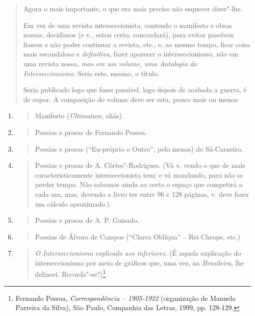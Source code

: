 \begin{quote}
Agora o mais importante, o que era mais preciso não esquecer dizer"-lhe.

Em vez de uma revista interseccionista, contendo o manifesto e obras
nossas, decidimos (e v., estou certo, concordará), para evitar possíveis
fiascos e não poder continuar a revista, etc., e, ao mesmo tempo, ficar
coisa mais escandalosa e \emph{definitiva}, fazer aparecer o
interseccionismo, não em uma revista nossa, \emph{mas em um volume, uma
Antologia do Interseccionismo}. Seria este, mesmo, o título.

Seria publicado logo que fosse possível, logo depois de acabada a
guerra, é de supor. A composição do volume deve ser esta, pouco mais ou
menos:
\end{quote}

\begin{enumerate}
\def\labelenumi{\arabic{enumi}.}
\item
  \begin{quote}
  Manifesto (\emph{Ultimatum}, aliás).
  \end{quote}
\item
  \begin{quote}
  Poesias e prosas de Fernando Pessoa.
  \end{quote}
\item
  \begin{quote}
  Poesias e prosas (``Eu-próprio o Outro'', pelo menos) do Sá-Carneiro.
  \end{quote}
\item
  \begin{quote}
  Poesias e prosas de A. Côrtes"-Rodrigues. (Vá v. vendo o que de mais
  caracteristicamente interseccionista tem; e vá mandando, para não se
  perder tempo. Não sabemos ainda ao certo o espaço que competirá a cada
  um, mas, devendo o livro ter entre 96 e 128 páginas, v. deve fazer um
  cálculo aproximado.)
  \end{quote}
\item
  \begin{quote}
  Poesias e prosas de A. P. Guisado.
  \end{quote}
\item
  \begin{quote}
  Poesias de Álvaro de Campos (``Chuva Oblíqua'' -- Rei Cheops, etc.)
  \end{quote}
\item
  \begin{quote}
  \emph{O Interseccionismo explicado aos inferiores}. (É aquela
  explicação do interseccionismo por meio de gráficos que, uma vez, na
  \emph{Brasileira}, lhe delineei. Recorda"-se?)\footnote{Fernando
    Pessoa, \emph{Correspondência -- 1905-1922} (organização de Manuela
    Parreira da Silva), São Paulo, Companhia das Letras, 1999, pp.
    128-129.}
  \end{quote}
\end{enumerate}

